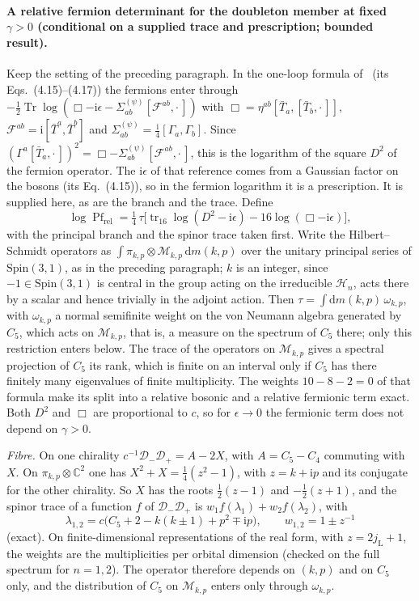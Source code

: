 \paragraph{A relative fermion determinant for the doubleton member at fixed \(\gamma>0\) (conditional on a supplied trace and prescription; bounded result).}
Keep the setting of the preceding paragraph. In the one-loop formula of~\cite{Steinacker2023} (its Eqs.~(4.15)--(4.17)) the fermions enter through \(-\tfrac12\operatorname{Tr}\log(\Box-\mathrm i\epsilon-\Sigma^{(\psi)}_{ab}[\mathcal F^{ab},\cdot\,])\) with \(\Box=\eta^{ab}[\bar T_a,[\bar T_b,\cdot\,]]\), \(\mathcal F^{ab}=\mathrm i[\bar T^a,\bar T^b]\) and \(\Sigma^{(\psi)}_{ab}=\tfrac{\mathrm i}4[\Gamma_a,\Gamma_b]\). Since \((\Gamma^a[\bar T_a,\cdot\,])^2=\Box-\Sigma^{(\psi)}_{ab}[\mathcal F^{ab},\cdot\,]\), this is the logarithm of the square \(D^2\) of the fermion operator. The \(\mathrm i\epsilon\) of that reference comes from a Gaussian factor on the bosons (its Eq.~(4.15)), so in the fermion logarithm it is a prescription. It is supplied here, as are the branch and the trace. Define
\[
\log\operatorname{Pf}_{\mathrm{rel}}=\tfrac14\,\tau\bigl[\operatorname{tr}_{16}\log(D^2-\mathrm i\epsilon)-16\log(\Box-\mathrm i\epsilon)\bigr],
\]
with the principal branch and the spinor trace taken first. Write the Hilbert--Schmidt operators as \(\int\pi_{k,p}\otimes\mathcal M_{k,p}\,\mathrm dm(k,p)\) over the unitary principal series of \(\mathrm{Spin}(3,1)\), as in the preceding paragraph; \(k\) is an integer, since \(-1\in\mathrm{Spin}(3,1)\) is central in the group acting on the irreducible \(\mathcal H_n\), acts there by a scalar and hence trivially in the adjoint action. Then \(\tau=\int\mathrm dm(k,p)\,\omega_{k,p}\), with \(\omega_{k,p}\) a normal semifinite weight on the von Neumann algebra generated by \(C_5\), which acts on \(\mathcal M_{k,p}\), that is, a measure on the spectrum of \(C_5\) there; only this restriction enters below. The trace of the operators on \(\mathcal M_{k,p}\) gives a spectral projection of \(C_5\) its rank, which is finite on an interval only if \(C_5\) has there finitely many eigenvalues of finite multiplicity. The weights \(10-8-2=0\) of that formula make its split into a relative bosonic and a relative fermionic term exact. Both \(D^2\) and \(\Box\) are proportional to \(c\), so for \(\epsilon\to0\) the fermionic term does not depend on \(\gamma>0\).

\emph{Fibre.} On one chirality \(c^{-1}\mathcal D_-\mathcal D_+=A-2X\), with \(A=C_5-C_4\) commuting with \(X\). On \(\pi_{k,p}\otimes\mathbb C^2\) one has \(X^2+X=\tfrac14(z^2-1)\), with \(z=k+\mathrm ip\) and its conjugate for the other chirality. So \(X\) has the roots \(\tfrac12(z-1)\) and \(-\tfrac12(z+1)\), and the spinor trace of a function \(f\) of \(\mathcal D_-\mathcal D_+\) is \(w_1f(\lambda_1)+w_2f(\lambda_2)\), with
\[
\lambda_{1,2}=c\bigl(C_5+2-k(k\pm1)+p^2\mp\mathrm ip\bigr),\qquad w_{1,2}=1\pm z^{-1}
\]
(exact). On finite-dimensional representations of the real form, with \(z=2j_{\mathrm L}+1\), the weights are the multiplicities per orbital dimension (checked on the full spectrum for \(n=1,2\)). The operator therefore depends on \((k,p)\) and on \(C_5\) only, and the distribution of \(C_5\) on \(\mathcal M_{k,p}\) enters only through \(\omega_{k,p}\).

